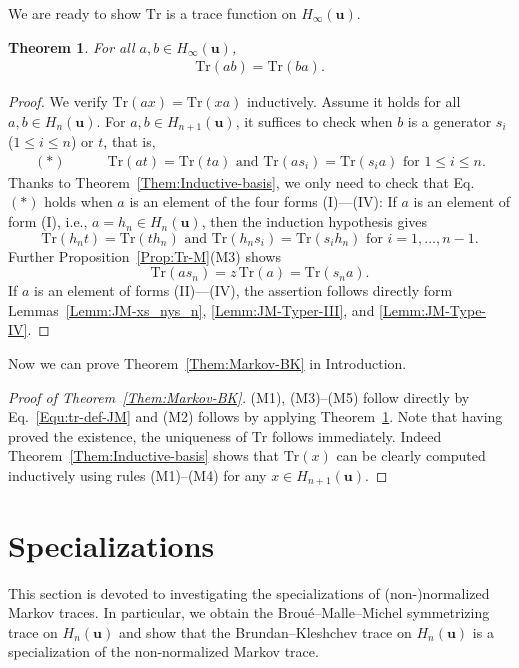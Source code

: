 \documentclass[a4paper, oneside]{amsart}
\numberwithin{equation}{section}
\newtheorem{theorem}[equation]{Theorem}
\theoremstyle{definition}
\theoremstyle{remark}
\begin{document}
We are ready to show $\mathrm{Tr}$ is a trace function on $H_{\infty}(\boldsymbol{u})$.

\begin{theorem}\label{Them:ab=ba}For all $a,b\in H_{\infty}(\boldsymbol{u})$,
\begin{align*}\mathrm{Tr}(ab)=\mathrm{Tr}(ba).
\end{align*}
  \end{theorem}

\begin{proof}We verify $\mathrm{Tr}(ax)=\mathrm{Tr}(xa)$ inductively. Assume it holds for all $a, b\in H_{n}(\boldsymbol{u})$. For $a, b\in H_{n+1}(\boldsymbol{u})$, it suffices to check when $b$ is a generator $s_i$ ($1\leq i\leq n$) or $t$, that is, \begin{align*}(*)\qquad\quad\mathrm{Tr}(at)=\mathrm{Tr}(ta) \text{ and } \mathrm{Tr}(as_i)=\mathrm{Tr}(s_ia)\text{ for }1\leq i\leq n.
\end{align*}
Thanks to Theorem~\ref{Them:Inductive-basis}, we only need to check that Eq.~$(*)$ holds when $a$ is an element of the four forms (I)---(IV):
 If $a$ is an element of form (I), i.e., $a=h_n\in H_n(\boldsymbol{u})$, then the induction hypothesis gives
\begin{equation*}
\mathrm{Tr}(h_nt)=\mathrm{Tr}(th_n)\text{ and }\mathrm{Tr}(h_ns_i)=\mathrm{Tr}(s_ih_n)\text{ for }i=1, \ldots, n-1.
\end{equation*}
 Further Proposition~\ref{Prop:Tr-M}(M3) shows
\begin{equation*}
  \mathrm{Tr}(as_n)=z\,\mathrm{Tr}(a)=\mathrm{Tr}(s_na).
\end{equation*}
If $a$ is an element of forms (II)---(IV), the assertion follows directly form Lemmas~\ref{Lemm:JM-xs_nys_n}, \ref{Lemm:JM-Typer-III}, and  \ref{Lemm:JM-Type-IV}.
\end{proof}

Now we can prove Theorem~\ref{Them:Markov-BK} in Introduction.
\begin{proof}[Proof of Theorem~\ref{Them:Markov-BK}] (M1), (M3)--(M5) follow directly by Eq.~\eqref{Equ:tr-def-JM} and (M2) follows by applying Theorem~\ref{Them:ab=ba}. Note that having proved the existence, the uniqueness of $\mathrm{Tr}$ follows immediately. Indeed Theorem~\ref{Them:Inductive-basis} shows that $\mathrm{Tr}(x)$ can be clearly computed inductively using rules (M1)--(M4) for any $x\in H_{n+1}(\boldsymbol{u})$.
\end{proof}


\section{Specializations}
This section is devoted to investigating the specializations of (non-)normalized Markov traces. In particular, we obtain the Brou\'{e}--Malle--Michel symmetrizing trace on $H_n(\boldsymbol{u})$ and show that the Brundan--Kleshchev trace on $H_n(\boldsymbol{u})$ is a specialization of the non-normalized Markov trace.
\end{document}
